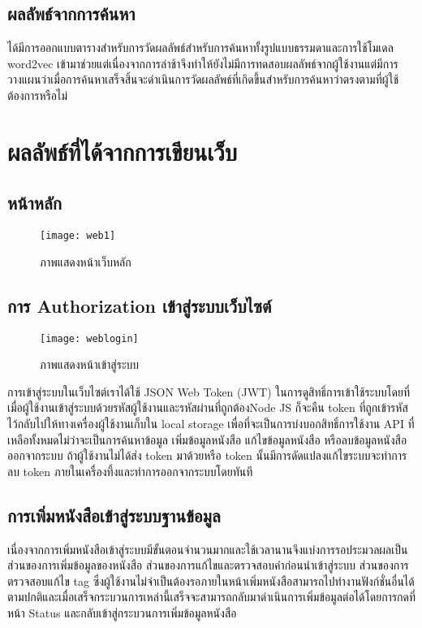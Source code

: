 \subsection{ผลลัพธ์จากการค้นหา}

ได้มีการออกแบบตารางสำหรับการวัดผลลัพธ์สำหรับการค้นหาทั้งรูปแบบธรรมดาและการใช้โมเดล word2vec เข้ามาช่วยแต่เนื่องจากการล่าช้าจึงทำให้ยังไม่มีการทดสอบผลลัพธ์จากผู้ใช้งานแต่มีการวางแผนว่าเมื่อการค้นหาเสร็จสิ้นจะดำเนินการวัดผลลัพธ์ที่เกิดขึ้นสำหรับการค้นหาว่าตรงตามที่ผู้ใช้ต้องการหรือไม่

\section{ผลลัพธ์ที่ได้จากการเขียนเว็บ}
\subsection{หน้าหลัก}
\begin{figure}[H]
    \centering
    \texttt{[image: web1]}
    \caption{ภาพแสดงหน้าเว็บหลัก}\label{fig:web1}
\end{figure}

\subsection{การ Authorization เข้าสู่ระบบเว็บไซต์}
\begin{figure}[H]
    \centering
    \texttt{[image: weblogin]}
    \caption{ภาพแสดงหน้าเข้าสู่ระบบ}\label{fig:weblogin}
\end{figure}
การเข้าสู่ระบบในเว็บไซต์เราได้ใช้ JSON Web Token (JWT) ในการดูสิทธิ์การเข้าใช้ระบบโดยที่เมื่อผู้ใช้งานเข้าสู่ระบบด้วยรหัสผู้ใช้งานและรหัสผ่านที่ถูกต้องNode JS ก็จะคืน token ที่ถูกเข้ารหัสไว้กลับไปให้ทางเครื่องผู้ใช้งานเก็บใน local storage เพื่อที่จะเป็นการบ่งบอกสิทธิ์การใช้งาน API ที่เหลือทั้งหมดไม่ว่าจะเป็นการค้นหาข้อมูล เพิ่มข้อมูลหนังสือ แก้ไขข้อมูลหนังสือ หรือลบข้อมูลหนังสือออกจากระบบ ถ้าผู้ใช้งานไม่ได้ส่ง token มาด้วยหรือ token นั้นมีการดัดแปลงแก้ไขระบบจะทำการลบ token ภายในเครื่องทึ้งและทำการออกจากระบบโดยทันที

\subsection{การเพิ่มหนังสือเข้าสู่ระบบฐานข้อมูล}
เนื่องจากการเพิ่มหนังสือเข้าสู่ระบบมีขั้นตอนจำนวนมากและใช้เวลานานจึงแบ่งการรอประมวลผลเป็นส่วนของการเพิ่มข้อมูลของหนังสือ ส่วนของการแก้ไขและตรวจสอบคำก่อนนำเข้าสู่ระบบ ส่วนของการตรวจสอบแก้ไข tag ซึ่งผู้ใช้งานไม่จำเป็นต้องรอภายในหน้าเพิ่มหนังสือสามารถไปทำงานฟังก์ชั่นอื่นได้ตามปกติและเมื่อเสร็จกระบวนการเหล่านี้เสร็จจะสามารถกลับมาดำเนินการเพิ่มข้อมูลต่อได้โดยการกดที่หน้า Status และกลับเข้าสู่กระบวนการเพิ่มข้อมูลหนังสือ
